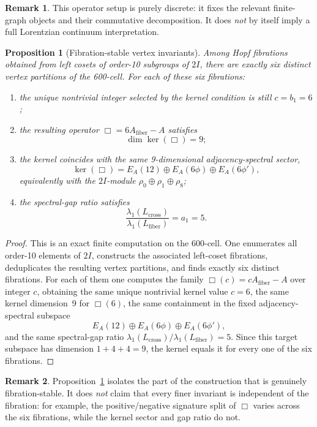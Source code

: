 \documentclass[12pt,a4paper]{article}
\newtheorem{proposition}{Proposition}
\theoremstyle{definition}
\newtheorem{remark}{Remark}
\begin{document}
\begin{remark}
This operator setup is purely discrete: it fixes the relevant finite-graph
objects and their commutative decomposition.  It does \emph{not} by itself
imply a full Lorentzian continuum interpretation.
\end{remark}

\begin{proposition}[Fibration-stable vertex invariants]
\label{prop:fibration_stable_exact}
Among Hopf fibrations obtained from left cosets of order-10 subgroups of $2I$, there are exactly six distinct vertex partitions of the 600-cell.  For each of these six fibrations:
\begin{enumerate}
\item the unique nontrivial integer selected by the kernel condition is still $c=b_1=6$;
\item the resulting operator $\Box=6A_{\mathrm{fiber}}-A$ satisfies
\[
\dim \ker(\Box)=9;
\]
\item the kernel coincides with the same 9-dimensional adjacency-spectral sector,
\[
\ker(\Box)=E_A(12)\oplus E_A(6\phi)\oplus E_A(6\phi'),
\]
equivalently with the $2I$-module $\rho_0\oplus\rho_1\oplus\rho_8$;
\item the spectral-gap ratio satisfies
\[
\frac{\lambda_1(L_{\mathrm{cross}})}{\lambda_1(L_{\mathrm{fiber}})}=a_1=5.
\]
\end{enumerate}
\end{proposition}

\begin{proof}
This is an exact finite computation on the 600-cell.  One enumerates all order-10 elements of $2I$, constructs the associated left-coset fibrations, deduplicates the resulting vertex partitions, and finds exactly six distinct fibrations.  For each of them one computes the family $\Box(c)=cA_{\mathrm{fiber}}-A$ over integer $c$, obtaining the same unique nontrivial kernel value $c=6$, the same kernel dimension~9 for $\Box(6)$, the same containment in the fixed adjacency-spectral subspace
\[
E_A(12)\oplus E_A(6\phi)\oplus E_A(6\phi'),
\]
and the same spectral-gap ratio $\lambda_1(L_{\mathrm{cross}})/\lambda_1(L_{\mathrm{fiber}})=5$.  Since this target subspace has dimension $1+4+4=9$, the kernel equals it for every one of the six fibrations.
\end{proof}

\begin{remark}
Proposition~\ref{prop:fibration_stable_exact} isolates the part of the construction that is genuinely fibration-stable.  It does \emph{not} claim that every finer invariant is independent of the fibration: for example, the positive/negative signature split of $\Box$ varies across the six fibrations, while the kernel sector and gap ratio do not.
\end{remark}
\end{document}
